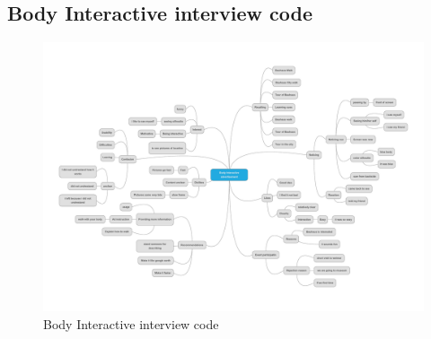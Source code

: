 \begin{appendices}
\section{Body Interactive interview code}
\begin{minipage}{1.14\textwidth}
\begin{flushleft} 
\begin{figure}[H]
 \centering 
    \includegraphics[width = \textwidth, height=0.8\textheight]{Appendices/8/body-interactive/body-Interactive_code.pdf}
    \caption{Body Interactive interview code}
     \label{app:body-interactiveinterviewcode_}%
\end{figure}
\end{flushleft} 
\end{minipage}




\end{appendices}
